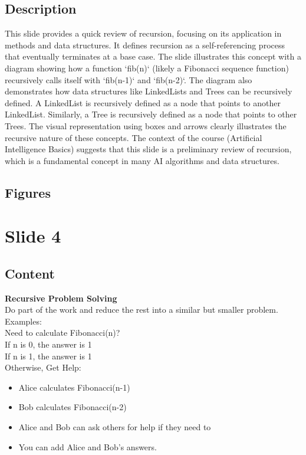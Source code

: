 \documentclass{article}%
\begin{document}
\subsection{Description}%
This slide provides a quick review of recursion, focusing on its application in methods and data structures.  It defines recursion as a self-referencing process that eventually terminates at a base case.  The slide illustrates this concept with a diagram showing how a function `fib(n)` (likely a Fibonacci sequence function) recursively calls itself with `fib(n-1)` and `fib(n-2)`.  The diagram also demonstrates how data structures like LinkedLists and Trees can be recursively defined.  A LinkedList is recursively defined as a node that points to another LinkedList.  Similarly, a Tree is recursively defined as a node that points to other Trees.  The visual representation using boxes and arrows clearly illustrates the recursive nature of these concepts.  The context of the course (Artificial Intelligence Basics) suggests that this slide is a preliminary review of recursion, which is a fundamental concept in many AI algorithms and data structures.%
\subsection{Figures}%
\begin{figure}[H]%
\centering%
\end{figure}

%
\newpage%
\section{Slide 4}%
\label{sec:Slide4}%
\subsection{Content}%

\textbf{Recursive Problem Solving} \\
Do part of the work and reduce the rest into a similar but smaller problem. \\
Examples: \\
Need to calculate Fibonacci(n)? \\
If n is 0, the answer is 1 \\
If n is 1, the answer is 1 \\
Otherwise, Get Help: \\
\begin{itemize}
    \item Alice calculates Fibonacci(n-1) \\
    \item Bob calculates Fibonacci(n-2) \\
    \item Alice and Bob can ask others for help if they need to \\
    \item You can add Alice and Bob's answers.
\end{itemize}
%
\end{document}
